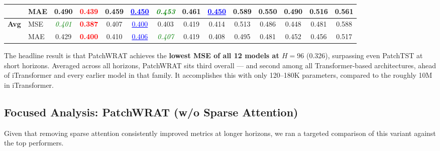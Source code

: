 \documentclass[11pt, letterpaper]{article}
\begin{document}
\begin{table}[H]
{\begin{tabular}{@{}llcccccccccccc@{}}
  & MAE & 0.490 & \textcolor{red}{\textbf{0.439}} & 0.459 & \textcolor{blue}{\underline{0.450}} & \textcolor{green}{\textit{0.453}} & 0.461 & \textcolor{blue}{\underline{0.450}} & 0.589 & 0.550 & 0.490 & 0.516 & 0.561 \\
\midrule
\multirow{2}{*}{\textbf{Avg}}
  & MSE & \textcolor{green}{\textit{0.401}} & \textcolor{red}{\textbf{0.387}} & 0.407 & \textcolor{blue}{\underline{0.400}} & 0.403 & 0.419 & 0.414 & 0.513 & 0.486 & 0.448 & 0.481 & 0.588 \\
  & MAE & 0.429 & \textcolor{red}{\textbf{0.400}} & 0.410 & \textcolor{blue}{\underline{0.406}} & \textcolor{green}{\textit{0.407}} & 0.419 & 0.408 & 0.495 & 0.481 & 0.452 & 0.456 & 0.517 \\
\bottomrule
\end{tabular}
}
\end{table}

The headline result is that PatchWRAT achieves the \textbf{lowest MSE of all 12 models at
$H=96$} (0.326), surpassing even PatchTST at short horizons. Averaged across all horizons,
PatchWRAT sits third overall — and second among all Transformer-based architectures, ahead of
iTransformer and every earlier model in that family. It accomplishes this with only 120--180K
parameters, compared to the roughly 10M in iTransformer.

\subsection{Focused Analysis: PatchWRAT (w/o Sparse Attention)}

Given that removing sparse attention consistently improved metrics at longer horizons, we ran
a targeted comparison of this variant against the top performers.
\end{document}
